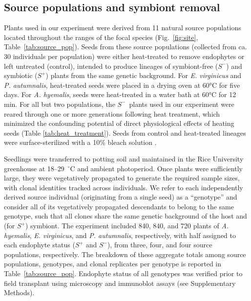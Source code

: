\documentclass[12pt]{article}\usepackage[]{graphicx}\usepackage[dvipsnames]{xcolor}
\begin{document}
\subsection*{Source populations and symbiont removal}
Plants used in our experiment were derived from 11 natural source populations located throughout the ranges of the focal species (Fig.~\ref{fig:site}, Table~\ref{tab:source_pop}). 
Seeds from these source populations (collected from ca. 30 individuals per population) were either heat-treated to remove endophytes or left untreated (control), intended to produce lineages of symbiont-free ($S^-$) and symbiotic ($S^+$) plants from the same genetic background. 
For \emph{E. virginicus} and \emph{P. autumnalis}, heat-treated seeds were placed in a drying oven at 60°C for five days. 
For \emph{A. hyemalis}, seeds were heat-treated in a water bath at 60°C for 12 min.
For all but two populations, the $S^-$\ plants used in our experiment were reared through one or more generations following heat treatment, which minimized the confounding potential of direct physiological effects of heating seeds (Table \ref{tab:heat_treatment}). 
Seeds from control and heat-treated lineages were surface-sterilized with a  10\% bleach solution \citep{Sahu2022sterilization}.

Seedlings were transferred to potting soil and maintained in the Rice University greenhouse at 18--29~$^\circ$C and ambient photoperiod.
Once plants were sufficiently large, they were vegetatively propagated to generate the required sample sizes, with clonal identities tracked across individuals. 
We refer to each independently derived source individual (originating from a single seed) as a ``genotype'' and consider all of its vegetatively propagated descendants to belong to the same genotype, such that all clones share the same genetic background of the host and (for $S^+$) symbiont.
The experiment included 840, 840, and 720 plants of \textit{A. hyemalis}, \textit{E. virginicus}, and \textit{P. autumnalis}, respectively, with half assigned to each endophyte status ($S^+$ and $S^-$), from three, four, and four source populations, respectively.
The breakdown of these aggregate totals among source populations, genotypes, and clonal replicates per genotype is reported in Table~\ref{tab:source_pop}.
Endophyte status of all genotypes was verified prior to field transplant using microscopy and immunoblot assays (see Supplementary Methods).
\end{document}
